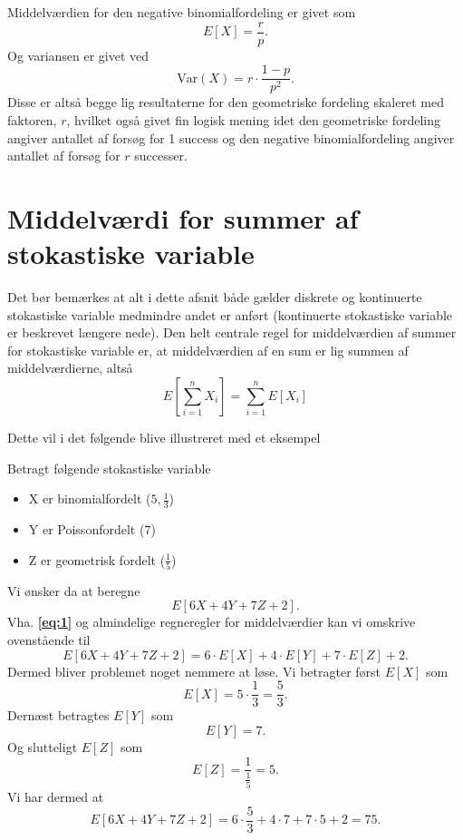 \begin{sæt}
  Middelværdien for den negative binomialfordeling er givet som
  \[ 
    E[X] = \frac{r}{p}
  .\]
  Og variansen er givet ved
  \[ 
    \mathrm{Var}(X) = r\cdot \frac{1-p}{p^2}
  .\]
  Disse er altså begge lig resultaterne for den geometriske fordeling skaleret med faktoren, $r$, hvilket også givet fin logisk mening idet den geometriske fordeling angiver antallet af forsøg for 1 success og den negative binomialfordeling angiver antallet af forsøg for $r$ successer.
\end{sæt}

\section{Middelværdi for summer af stokastiske variable}
Det bør bemærkes at alt i dette afsnit både gælder diskrete og kontinuerte stokastiske variable medmindre andet er anført (kontinuerte stokastiske variable er beskrevet længere nede). Den helt centrale regel for middelværdien af summer for stokastiske variable er, at middelværdien af en sum er lig summen af middelværdierne, altså
\begin{equation} \label{eq:1}
    E[\sum_{i = 1}^{n} X_i] = \sum_{i = 1}^{n} E[X_i] 
\end{equation}

Dette vil i det følgende blive illustreret med et eksempel
\begin{eks}
  Betragt følgende stokastiske variable
  \begin{itemize}
    \item X er binomialfordelt ($5,\frac{1}{3}$)
    \item Y er Poissonfordelt ($7$)
    \item Z er geometrisk fordelt ($\frac{1}{5}$)
  \end{itemize}
  Vi ønsker da at beregne
  \[ 
    E[6X + 4Y + 7Z + 2]
  .\]
  Vha. \textbf{\autoref{eq:1}} og almindelige regneregler for middelværdier kan vi omskrive ovenstående til
  \[ 
    E[6X + 4Y + 7Z + 2] = 6\cdot E[X] + 4\cdot E[Y] + 7\cdot E[Z] + 2
  .\]
  Dermed bliver problemet noget nemmere at løse. Vi betragter først $E[X]$ som
  \[ 
    E[X] = 5\cdot \frac{1}{3} = \frac{5}{3}
  .\]
  Dernæst betragtes $E[Y]$ som
  \[ 
    E[Y] = 7
  .\]
  Og slutteligt $E[Z]$ som
  \[ 
    E[Z] = \frac{1}{\frac{1}{5}} = 5
  .\]
  Vi har dermed at
  \[ 
    E[6X + 4Y + 7Z + 2] = 6 \cdot \frac{5}{3} + 4\cdot 7 + 7 \cdot 5 + 2 = 75
  .\]
\end{eks}

